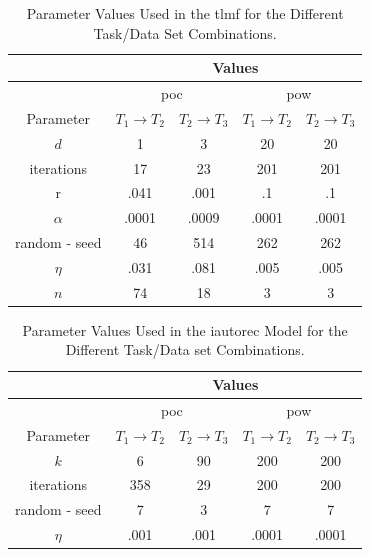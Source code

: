 \begin{table}[h!]
    \centering
    \begin{tabular}{|c|c|c|c|c|}
        \hline
         & \multicolumn{4}{|c|}{Values} \\
        \hline & \multicolumn{2}{|c|}{\acrshort{poc}} & \multicolumn{2}{|c|}{\acrshort{pow}} \\
        \hline Parameter & $T_1 \to T_2$  & $T_2 \to T_3$  & $T_1 \to T_2$  & $T_2 \to T_3$ \\
        \hline  $d$ & 1 & 3 & 20 & 20\\
          iterations & 17 & 23 & 201 & 201\\
          r & .041 & .001 & .1 & .1\\
          $\alpha$ & .0001 & .0009 & .0001 & .0001\\
          random - seed & 46 & 514 & 262 & 262\\
          $\eta$ & .031 & .081 & .005 & .005\\
          $n$ & 74 & 18 & 3 & 3\\
        \hline
    \end{tabular}
    \caption{Parameter Values Used in the \acrshort{tlmf} for the Different Task/Data Set Combinations.}
    \label{tab:tlmf}
\end{table}

\begin{table}[h!]
    \centering
    \begin{tabular}{|c|c|c|c|c|}
        \hline
         & \multicolumn{4}{|c|}{Values} \\
        \hline & \multicolumn{2}{|c|}{\acrshort{poc}} & \multicolumn{2}{|c|}{\acrshort{pow}} \\
        \hline Parameter & $T_1 \to T_2$  & $T_2 \to T_3$  & $T_1 \to T_2$  & $T_2 \to T_3$ \\
        \hline  $k$ & 6 & 90 & 200 & 200\\
          iterations & 358 & 29 & 200 & 200\\
          random - seed & 7 & 3 & 7 & 7\\
          $\eta$ & .001 & .001 & .0001 & .0001\\
        \hline
    \end{tabular}
    \caption{Parameter Values Used in the \acrshort{iautorec} Model for the Different Task/Data set Combinations.}
    \label{tab:autorec}
\end{table}

